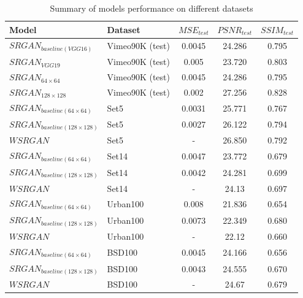 \documentclass[conference]{IEEEtran}
\begin{document}
\begin{table}[htb]
	\centering
	\caption{Summary of models performance on different datasets}
	\label{tab:models_metrics_summary}
	\begin{tabular}{|l|l|c|c|c|}
	\hline
	Model                               & Dataset         & $MSE_{test}$ & $PSNR_{test}$ & $SSIM_{test}$  \\ \hline
    $SRGAN_{baseline (VGG16)}$          & Vimeo90K (test) & 0.0045       & 24.286        & 0.795          \\ \hline
	$SRGAN_{VGG19}$                     & Vimeo90K (test) & 0.005        & 23.720        & 0.803          \\ \hline

	$SRGAN_{64 \times 64}$              & Vimeo90K (test) & 0.0045       & 24.286        & 0.795          \\ \hline
	$SRGAN_{128 \times 128}$            & Vimeo90K (test) & 0.002        & 27.256        & 0.828          \\ \hline

	$SRGAN_{baseline (64 \times 64)}$   & Set5            & 0.0031       & 25.771        & 0.767          \\ \hline
	$SRGAN_{baseline (128 \times 128)}$ & Set5            & 0.0027       & 26.122        & 0.794          \\ \hline
	$WSRGAN$                            & Set5            & -            & 26.850        & 0.792          \\ \hline

    $SRGAN_{baseline (64 \times 64)}$   & Set14           & 0.0047       & 23.772        & 0.679          \\ \hline
	$SRGAN_{baseline (128 \times 128)}$ & Set14           & 0.0042       & 24.281        & 0.699          \\ \hline
	$WSRGAN$                            & Set14           & -            & 24.13         & 0.697          \\ \hline

	$SRGAN_{baseline (64 \times 64)}$   & Urban100        & 0.008        & 21.836        & 0.654          \\ \hline
	$SRGAN_{baseline (128 \times 128)}$ & Urban100        & 0.0073       & 22.349        & 0.680          \\ \hline
	$WSRGAN$                            & Urban100        & -            & 22.12         & 0.660          \\ \hline

	$SRGAN_{baseline (64 \times 64)}$   & BSD100          & 0.0045       & 24.166        & 0.656          \\ \hline
	$SRGAN_{baseline (128 \times 128)}$ & BSD100          & 0.0043       & 24.555        & 0.670          \\ \hline
	$WSRGAN$                            & BSD100          & -            & 24.67         & 0.679          \\ \hline
\end{tabular}
\end{table}
\end{document}
